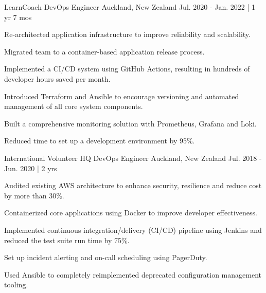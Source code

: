 \begin{cventries}

\cventry
{LearnCoach} %
{DevOps Engineer} %
{Auckland, New Zealand} %
{Jul. 2020 - Jan. 2022 | 1 yr 7 mos} %
{ %
\begin{cvitems}
\item {Re-architected application infrastructure to improve reliability and scalability.}
\item {Migrated team to a container-based application release process.}
\item {Implemented a CI/CD system using GitHub Actions, resulting in hundreds of developer hours saved per month.}
\item {Introduced Terraform and Ansible to encourage versioning and automated management of all core system components.}
\item {Built a comprehensive monitoring solution with Prometheus, Grafana and Loki.}
\item {Reduced time to set up a development environment by 95\%.}
\end{cvitems}
}


\cventry
{International Volunteer HQ} %
{DevOps Engineer} %
{Auckland, New Zealand} %
{Jul. 2018 - Jun. 2020 | 2 yrs} %
{ %
\begin{cvitems}
\item {Audited existing AWS architecture to enhance security, resilience and reduce cost by more than 30\%.}
\item {Containerized core applications using Docker to improve developer effectiveness.}
\item {Implemented continuous integration/delivery (CI/CD) pipeline using Jenkins and reduced the test suite run time by 75\%.}
\item {Set up incident alerting and on-call scheduling using PagerDuty.}
\item {Used Ansible to completely reimplemented deprecated configuration management tooling.}
\end{cvitems}
}



\end{cventries}
